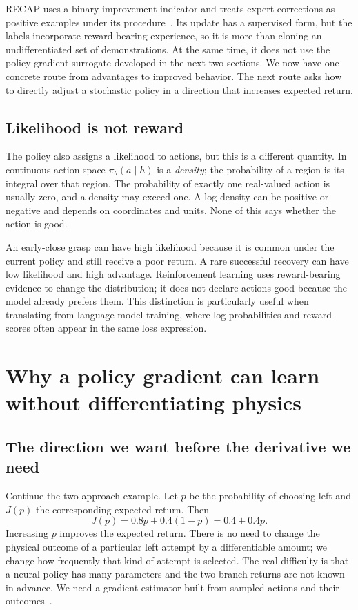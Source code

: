 RECAP uses a binary improvement indicator and treats expert corrections as positive examples under its procedure~\citep{recap}. Its update has a supervised form, but the labels incorporate reward-bearing experience, so it is more than cloning an undifferentiated set of demonstrations. At the same time, it does not use the policy-gradient surrogate developed in the next two sections. We now have one concrete route from advantages to improved behavior. The next route asks how to directly adjust a stochastic policy in a direction that increases expected return.

\subsection{Likelihood is not reward}
The policy also assigns a likelihood to actions, but this is a different quantity. In continuous action space $\pi_\theta(a\mid h)$ is a \emph{density}; the probability of a region is its integral over that region. The probability of exactly one real-valued action is usually zero, and a density may exceed one. A log density can be positive or negative and depends on coordinates and units. None of this says whether the action is good.

An early-close grasp can have high likelihood because it is common under the current policy and still receive a poor return. A rare successful recovery can have low likelihood and high advantage. Reinforcement learning uses reward-bearing evidence to change the distribution; it does not declare actions good because the model already prefers them. This distinction is particularly useful when translating from language-model training, where log probabilities and reward scores often appear in the same loss expression.

\section{Why a policy gradient can learn without differentiating physics}
\label{sec:policy-gradient}
\subsection{The direction we want before the derivative we need}
Continue the two-approach example. Let $p$ be the probability of choosing left and $J(p)$ the corresponding expected return. Then
\begin{equation}
 J(p)=0.8p+0.4(1-p)=0.4+0.4p.
 \label{eq:two-action-return}
\end{equation}
Increasing $p$ improves the expected return. There is no need to change the physical outcome of a particular left attempt by a differentiable amount; we change how frequently that kind of attempt is selected. The real difficulty is that a neural policy has many parameters and the two branch returns are not known in advance. We need a gradient estimator built from sampled actions and their outcomes~\citep{policygradient}.

